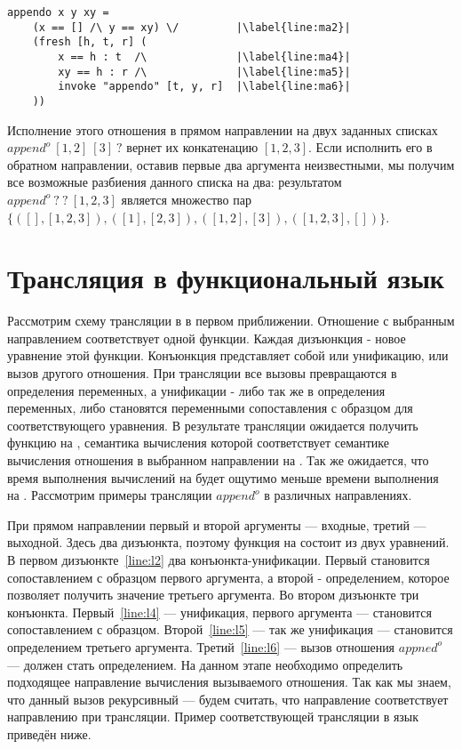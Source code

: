 \documentclass[conference]{IEEEtran}
\begin{document}
\begin{lstlisting}[frame=single, escapechar=|]
appendo x y xy =
    (x == [] /\ y == xy) \/         |\label{line:ma2}|
    (fresh [h, t, r] (         
        x == h : t  /\              |\label{line:ma4}|
        xy == h : r /\              |\label{line:ma5}|
        invoke "appendo" [t, y, r]  |\label{line:ma6}|
    ))
\end{lstlisting}

Исполнение этого отношения в прямом направлении на двух заданных списках $append^o \ [1,2] \ [3] \ ?$ вернет их конкатенацию $[1,2,3]$.
Если исполнить его в обратном направлении, оставив первые два аргумента неизвестными, мы получим все возможные разбиения данного списка на два: результатом $append^o \ ? \ ? \ [1,2,3]$ является множество пар $\{([],[1,2,3]), ([1], [2,3]), ([1,2], [3]), ([1,2,3], [])\}$.

\section{Трансляция в функциональный язык}\label{translator}

Рассмотрим схему трансляции \miniKanren в \haskell в первом приближении.
Отношение с выбранным направлением соответствует одной функции.
Каждая дизъюнкция - новое уравнение этой функции.
Конъюнкция представляет собой или унификацию, или вызов другого отношения.
При трансляции все вызовы превращаются в определения переменных, а унификации - либо так же в определения переменных, либо становятся переменными сопоставления с образцом для соответствующего уравнения.
В результате трансляции ожидается получить функцию на \haskell{}, семантика вычисления которой соответствует семантике вычисления отношения в выбранном направлении на \miniKanren{}.
Так же ожидается, что время выполнения вычислений на \haskell{} будет ощутимо меньше времени выполнения на \miniKanren{}.
Рассмотрим примеры трансляции $append^o$ в различных направлениях.

При прямом направлении первый и второй аргументы --- входные, третий --- выходной.
Здесь два дизъюнкта, поэтому функция на \haskell{} состоит из двух уравнений.
В первом дизъюнкте~\ref{line:l2} два конъюнкта-унификации.
Первый становится сопоставлением с образцом первого аргумента, а второй - определением, которое позволяет получить значение третьего аргумента.
Во втором дизъюнкте три конъюнкта.
Первый~\ref{line:l4} --- унификация, первого аргумента --- становится сопоставлением с образцом.
Второй~\ref{line:l5} --- так же унификация --- становится определением третьего аргумента.
Третий~\ref{line:l6} --- вызов отношения $appned^o$ --- должен стать определением.
На данном этапе необходимо определить подходящее направление вычисления вызываемого отношения.
Так как мы знаем, что данный вызов рекурсивный --- будем считать, что направление соответствует направлению при трансляции.
Пример соответствующей трансляции в язык \haskell{} приведён ниже.
\end{document}

